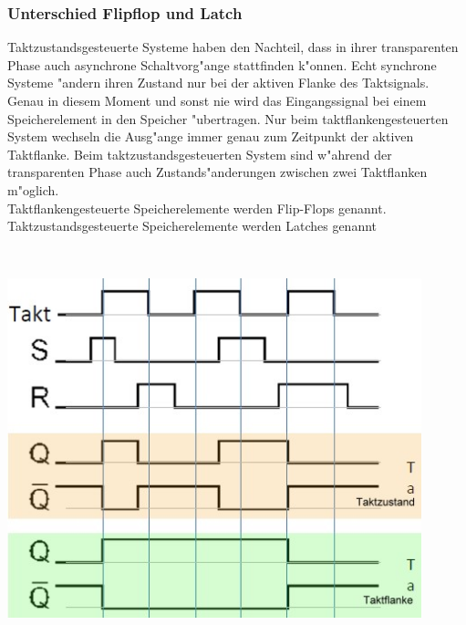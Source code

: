 	\subsubsection{Unterschied Flipflop und Latch}
		\begin{minipage}{12 cm}
			Taktzustandsgesteuerte Systeme haben den Nachteil, dass in ihrer transparenten Phase auch asynchrone Schaltvorg"ange stattfinden k"onnen. Echt synchrone Systeme "andern ihren Zustand nur bei der aktiven Flanke des Taktsignals. Genau in diesem Moment und sonst nie wird das Eingangssignal bei einem Speicherelement in den Speicher "ubertragen. Nur beim taktflankengesteuerten System wechseln die Ausg"ange immer genau zum Zeitpunkt der aktiven Taktflanke. Beim taktzustandsgesteuerten System sind w"ahrend der transparenten Phase auch Zustands"anderungen zwischen zwei Taktflanken m"oglich. \\
			Taktflankengesteuerte Speicherelemente werden Flip-Flops genannt. Taktzustandsgesteuerte Speicherelemente werden Latches genannt
		\end{minipage}
		\begin{minipage}{0.5 cm}
			\ 
		\end{minipage}
		\begin{minipage}{6 cm}
			\includegraphics[width=0.9\textwidth]{pics/flipflop_latch}
		\end{minipage}
		
